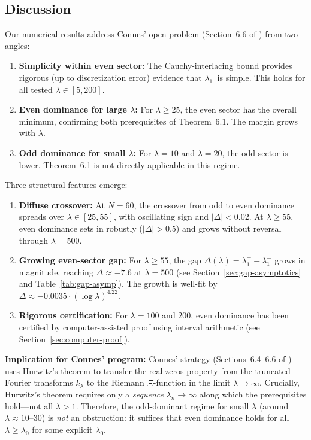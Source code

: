 \documentclass[12pt,a4paper]{article}
\theoremstyle{definition}
\theoremstyle{remark}
\begin{document}
\subsection{Discussion}

Our numerical results address Connes' open problem (Section~6.6 of \cite{Connes2025}) from two angles:
\begin{enumerate}
  \item \textbf{Simplicity within even sector:} The Cauchy-interlacing bound provides rigorous (up to discretization error) evidence that $\lambda_1^+$ is simple. This holds for all tested $\lambda \in [5, 200]$.
  \item \textbf{Even dominance for large $\lambda$:} For $\lambda \geq 25$, the even sector has the overall minimum, confirming both prerequisites of Theorem~6.1. The margin grows with $\lambda$.
  \item \textbf{Odd dominance for small $\lambda$:} For $\lambda = 10$ and $\lambda = 20$, the odd sector is lower. Theorem~6.1 is not directly applicable in this regime.
\end{enumerate}

Three structural features emerge:

\begin{enumerate}
  \item \textbf{Diffuse crossover:} At $N=60$, the crossover from odd to even dominance spreads over $\lambda \in [25, 55]$, with oscillating sign and $|\Delta| < 0.02$. At $\lambda \geq 55$, even dominance sets in robustly ($|\Delta| > 0.5$) and grows without reversal through $\lambda = 500$.

  \item \textbf{Growing even-sector gap:} For $\lambda \geq 55$, the gap $\Delta(\lambda) = \lambda_1^+ - \lambda_1^-$ grows in magnitude, reaching $\Delta \approx -7.6$ at $\lambda = 500$ (see Section~\ref{sec:gap-asymptotics} and Table~\ref{tab:gap-asymp}). The growth is well-fit by $\Delta \approx -0.0035 \cdot (\log\lambda)^{4.22}$.

  \item \textbf{Rigorous certification:} For $\lambda = 100$ and $200$, even dominance has been certified by computer-assisted proof using interval arithmetic (see Section~\ref{sec:computer-proof}).
\end{enumerate}

\textbf{Implication for Connes' program:} Connes' strategy (Sections~6.4--6.6 of \cite{Connes2025}) uses Hurwitz's theorem to transfer the real-zeros property from the truncated Fourier transforms $\hat{k}_\lambda$ to the Riemann $\Xi$-function in the limit $\lambda \to \infty$. Crucially, Hurwitz's theorem requires only a \emph{sequence} $\lambda_n \to \infty$ along which the prerequisites hold---not all $\lambda > 1$. Therefore, the odd-dominant regime for small $\lambda$ (around $\lambda \approx 10$--$30$) is \emph{not} an obstruction: it suffices that even dominance holds for all $\lambda \geq \lambda_0$ for some explicit $\lambda_0$.
\end{document}
